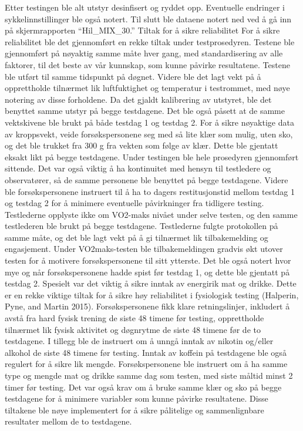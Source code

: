 \documentclass[
  letterpaper,
  DIV=11,
  numbers=noendperiod]{scrreprt}
\begin{document}
Etter testingen ble alt utstyr desinfisert og ryddet opp. Eventuelle
endringer i sykkelinnstillinger ble også notert. Til slutt ble dataene
notert ned ved å gå inn på skjermrapporten ``Hil\_MIX\_30.'' Tiltak for
å sikre reliabilitet For å sikre reliabilitet ble det gjennomført en
rekke tiltak under testprosedyren. Testene ble gjennomført på nøyaktig
samme måte hver gang, med standardisering av alle faktorer, til det
beste av vår kunnskap, som kunne påvirke resultatene. Testene ble utført
til samme tidspunkt på døgnet. Videre ble det lagt vekt på å
opprettholde tilnærmet lik luftfuktighet og temperatur i testrommet, med
nøye notering av disse forholdene. Da det gjaldt kalibrering av
utstyret, ble det benyttet samme utstyr på begge testdagene. Det ble
også påsett at de samme vektskivene ble brukt på både testdag 1 og
testdag 2. For å sikre nøyaktige data av kroppsvekt, veide
forsøkspersonene seg med så lite klær som mulig, uten sko, og det ble
trukket fra 300 g fra vekten som følge av klær. Dette ble gjentatt
eksakt likt på begge testdagene. Under testingen ble hele prosedyren
gjennomført sittende. Det var også viktig å ha kontinuitet med hensyn
til testledere og observatører, så de samme personene ble benyttet på
begge testdagene. Videre ble forsøkspersonene instruert til å ha to
dagers restitusjonstid mellom testdag 1 og testdag 2 for å minimere
eventuelle påvirkninger fra tidligere testing. Testlederne opplyste ikke
om VO2-maks nivået under selve testen, og den samme testlederen ble
brukt på begge testdagene. Testlederne fulgte protokollen på samme måte,
og det ble lagt vekt på å gi tilnærmet lik tilbakemelding og
engasjement. Under VO2maks-testen ble tilbakemeldingen gradvis økt
utover testen for å motivere forsøkspersonene til sitt ytterste. Det ble
også notert hvor mye og når forsøkspersonene hadde spist før testdag 1,
og dette ble gjentatt på testdag 2. Spesielt var det viktig å sikre
inntak av energirik mat og drikke. Dette er en rekke viktige tiltak for
å sikre høy reliabilitet i fysiologisk testing (Halperin, Pyne, and
Martin 2015). Forsøkspersonene fikk klare retningslinjer, inkludert å
avstå fra hard fysisk trening de siste 48 timene før testing,
opprettholde tilnærmet lik fysisk aktivitet og døgnrytme de siste 48
timene før de to testdagene. I tillegg ble de instruert om å unngå
inntak av nikotin og/eller alkohol de siste 48 timene før testing.
Inntak av koffein på testdagene ble også regulert for å sikre lik
mengde. Forsøkspersonene ble instruert om å ha samme type og mengde mat
og drikke samme dag som testen, med siste måltid minst 2 timer før
testing. Det var også krav om å bruke samme klær og sko på begge
testdagene for å minimere variabler som kunne påvirke resultatene. Disse
tiltakene ble nøye implementert for å sikre pålitelige og sammenlignbare
resultater mellom de to testdagene.
\end{document}
